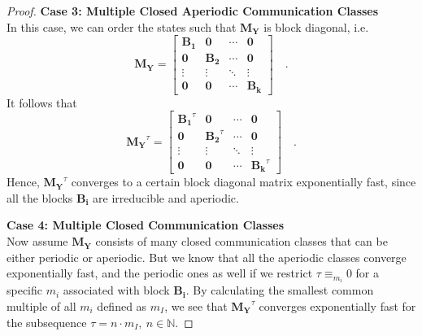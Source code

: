 \documentclass[../../main.tex]{subfiles}
\begin{document}
\begin{proof}
        \textbf{Case 3: Multiple Closed Aperiodic Communication Classes} \\
        In this case, we can order the states such that $\bm{M_Y}$ is block diagonal, i.e.
        \[
            \bm{M_Y} = 
            \begin{bmatrix}
            \bm{B_1} & \bm{0} & \cdots & \bm{0} \\
            \bm{0} & \bm{B_2} & \cdots & \bm{0} \\
            \vdots & \vdots & \ddots & \vdots \\
            \bm{0} & \bm{0} & \cdots & \bm{B_k}
            \end{bmatrix}
            \quad .
        \]
        It follows that
        \[
            \bm{M_Y}^\tau = 
            \begin{bmatrix}
            \bm{B_1}^\tau & \bm{0} & \cdots & \bm{0} \\
            \bm{0} & \bm{B_2}^\tau & \cdots & \bm{0} \\
            \vdots & \vdots & \ddots & \vdots \\
            \bm{0} & \bm{0} & \cdots & \bm{B_k}^\tau
            \end{bmatrix}
            \quad .
        \]
        Hence, $\bm{M_Y}^\tau$ converges to a certain block diagonal matrix exponentially fast, since all the blocks $\bm{B_i}$ are irreducible and aperiodic.

        \textbf{Case 4: Multiple Closed Communication Classes} \\
        Now assume $\bm{M_Y}$ consists of many closed communication classes that can be either periodic or aperiodic. But we know that all the aperiodic classes converge exponentially fast, and the periodic ones as well if we restrict $\tau \equiv_{m_i} 0$ for a specific $m_i$ associated with block $\bm{B_i}$. By calculating the smallest common multiple of all $m_i$ defined as $m_I$, we see that $\bm{M_Y}^\tau$ converges exponentially fast for the subsequence $\tau = n \cdot m_I, \ n \in \mathbb{N}$.


\end{proof}
\end{document}
